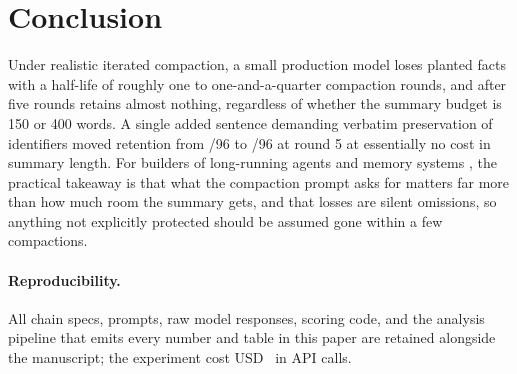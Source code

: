 \documentclass[11pt]{article}
\begin{document}
\section{Conclusion}

Under realistic iterated compaction, a small production model loses planted
facts with a half-life of roughly one to one-and-a-quarter compaction rounds,
and after five rounds retains almost nothing, regardless of whether the summary
budget is 150 or 400 words. A single added sentence demanding verbatim
preservation of identifiers moved retention from \ArmACntFive/96 to
\ArmCCntFive/96 at round 5 at essentially no cost in summary length. For
builders of long-running agents and memory systems
\cite{chhikara2025mem0,suzgun2025dynamic,zhang2025agentic}, the practical
takeaway is that what the compaction prompt asks for matters far more than how
much room the summary gets, and that losses are silent omissions, so anything
not explicitly protected should be assumed gone within a few compactions.

\paragraph{Reproducibility.} All chain specs, prompts, raw model responses,
scoring code, and the analysis pipeline that emits every number and table in
this paper are retained alongside the manuscript; the experiment cost
USD~\GrandCost{} in API calls.





\end{document}
